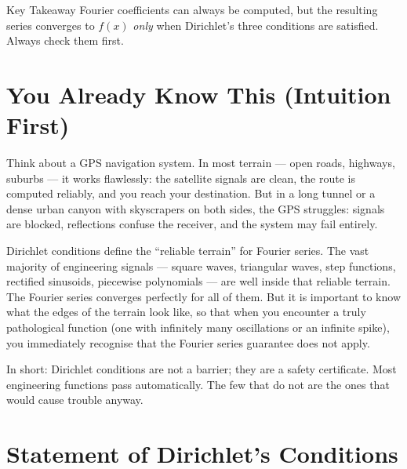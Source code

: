 \documentclass[12pt,a4paper]{article}
\begin{document}
\begin{learnbox}{Key Takeaway}
Fourier coefficients can always be computed, but the resulting series converges to $f(x)$ \emph{only} when Dirichlet's three conditions are satisfied. Always check them first.
\end{learnbox}

\section{You Already Know This (Intuition First)}

Think about a GPS navigation system. In most terrain --- open roads, highways, suburbs --- it works flawlessly: the satellite signals are clean, the route is computed reliably, and you reach your destination. But in a long tunnel or a dense urban canyon with skyscrapers on both sides, the GPS struggles: signals are blocked, reflections confuse the receiver, and the system may fail entirely.

Dirichlet conditions define the ``reliable terrain'' for Fourier series. The vast majority of engineering signals --- square waves, triangular waves, step functions, rectified sinusoids, piecewise polynomials --- are well inside that reliable terrain. The Fourier series converges perfectly for all of them. But it is important to know what the edges of the terrain look like, so that when you encounter a truly pathological function (one with infinitely many oscillations or an infinite spike), you immediately recognise that the Fourier series guarantee does not apply.

In short: Dirichlet conditions are not a barrier; they are a safety certificate. Most engineering functions pass automatically. The few that do not are the ones that would cause trouble anyway.

\section{Statement of Dirichlet's Conditions}
\end{document}
